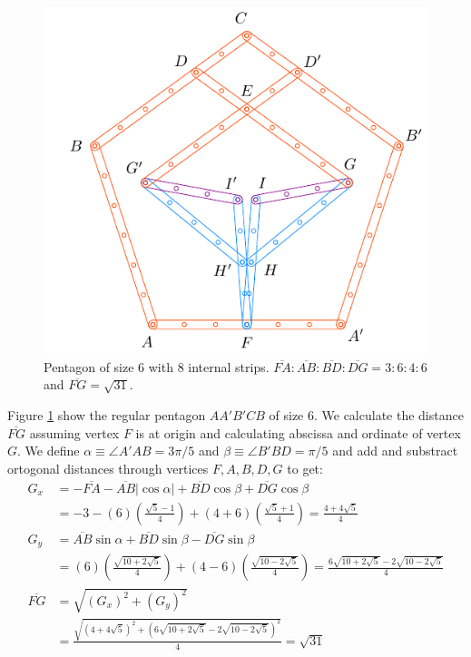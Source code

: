 \documentclass[11pt]{article}
\begin{document}
\begin{figure}[H]
\centering
\includegraphics[scale=1.2]{6/penta6-8b}
\caption{Pentagon of size 6 with 8 internal strips. $\overline{FA} : \overline{AB} : \overline{BD} : \overline{DG} = 3:6:4:6$ and $\overline{FG} = \sqrt{31}$.}
\label{fig:penta6-8b}
\end{figure}

Figure \ref{fig:penta6-8b} show the regular pentagon $AA'B'CB$ of size $6$. We calculate the distance $\overline{FG}$ assuming vertex $F$ is at origin and calculating abscissa and ordinate of vertex $G$. We define $\alpha \equiv \angle{A'AB} = 3\pi / 5$ and $\beta \equiv \angle{B'BD} = \pi / 5$ and add and substract ortogonal distances through vertices $F,A,B,D,G$ to get:
\begin{align}
G_x &= -\overline{FA} -\overline{AB}|\cos\alpha| + \overline{BD}\cos\beta + \overline{DG}\cos\beta \nonumber\\
 &= -3 -(6)\left(\frac{\sqrt5 - 1}4\right) + (4+6)\left(\frac{\sqrt5+1}4\right)
 = \frac{4 + 4\sqrt5}4 \\
G_y &= \overline{AB}\sin\alpha + \overline{BD}\sin\beta - \overline{DG}\sin\beta \nonumber\\
 &= (6)\left(\frac{\sqrt{10+2\sqrt5}}4\right) + (4-6)\left(\frac{\sqrt{10-2\sqrt5}}4\right)
 = \frac{6\sqrt{10+2\sqrt5} - 2\sqrt{10-2\sqrt5}}4 \\
%
\overline{FG} &= \sqrt{(G_x)^2 + (G_y)^2} \nonumber\\
 &= \frac{\sqrt{(4+4\sqrt5)^2 + (6\sqrt{10+2\sqrt5} -2\sqrt{10-2\sqrt5})^2}}4
 = \sqrt{31}
\end{align}
\end{document}
